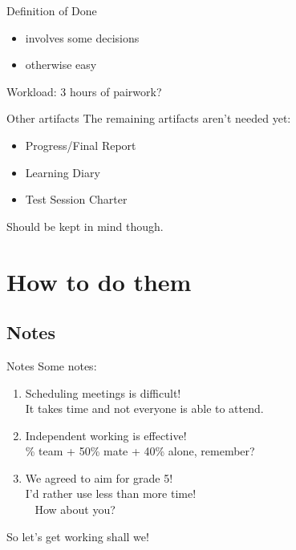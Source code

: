 \documentclass{beamer}
\newcommand{\bgset}[1]{
  \usebackgroundtemplate{
    \texttt{[image: \#1]}
  }
}
\begin{document}
\begin{frame}{Definition of Done}{}
  \begin{itemize}
  \item involves some decisions
  \item otherwise easy
  \end{itemize}
  Workload: 3 hours of pairwork?
\end{frame}
\begin{frame}{Other artifacts}{}
  The remaining artifacts aren't needed yet:
  \begin{itemize}
  \item Progress/Final Report
  \item Learning Diary
  \item Test Session Charter
  \end{itemize}
  Should be kept in mind though.
\end{frame}

\section{How to do them}

\subsection{Notes} \bgset{../gfx/neural3__bgmod.jpg}
\begin{frame}{Notes}{}
  Some notes:
  \begin{enumerate}
  \pause \item Scheduling meetings is difficult! \\
  \pause It takes time and not everyone is able to attend.
  \pause \item Independent working is effective! \\
  \% team + 50\% mate + 40\% alone, remember?
  \pause \item We agreed to aim for grade 5! \\
  \pause I'd rather use \alert{less} than more time! \\
  ~ How about you?
  \end{enumerate}
  \pause So let's get working shall we!
\end{frame}
\end{document}
